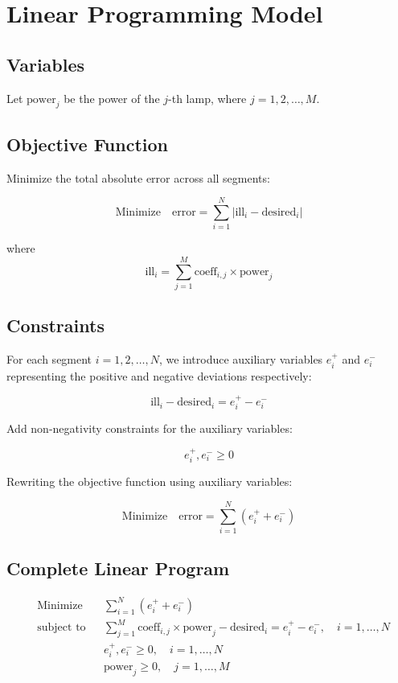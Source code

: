 \documentclass{article}
\begin{document}
\section*{Linear Programming Model}

\subsection*{Variables}
Let \( \text{power}_j \) be the power of the \( j \)-th lamp, where \( j = 1, 2, \ldots, M \).

\subsection*{Objective Function}
Minimize the total absolute error across all segments:

\[
\text{Minimize} \quad \text{error} = \sum_{i=1}^{N} | \text{ill}_i - \text{desired}_i |
\]

where
\[
\text{ill}_i = \sum_{j=1}^{M} \text{coeff}_{i,j} \times \text{power}_j
\]

\subsection*{Constraints}
For each segment \( i = 1, 2, \ldots, N \), we introduce auxiliary variables \( e_i^+ \) and \( e_i^- \) representing the positive and negative deviations respectively:

\[
\text{ill}_i - \text{desired}_i = e_i^+ - e_i^-
\]

Add non-negativity constraints for the auxiliary variables:

\[
e_i^+, e_i^- \geq 0
\]

Rewriting the objective function using auxiliary variables:

\[
\text{Minimize} \quad \text{error} = \sum_{i=1}^{N} (e_i^+ + e_i^-)
\]

\subsection*{Complete Linear Program}
\[
\begin{aligned}
    & \text{Minimize} & & \sum_{i=1}^{N} (e_i^+ + e_i^-) \\
    & \text{subject to} & & \sum_{j=1}^{M} \text{coeff}_{i,j} \times \text{power}_j - \text{desired}_i = e_i^+ - e_i^-, \quad i = 1, \ldots, N \\
    & & & e_i^+, e_i^- \geq 0, \quad i = 1, \ldots, N \\
    & & & \text{power}_j \geq 0, \quad j = 1, \ldots, M
\end{aligned}
\]
\end{document}
